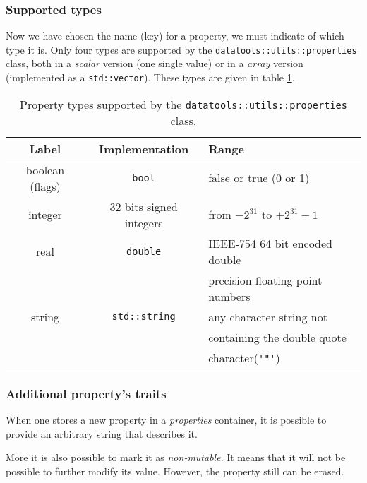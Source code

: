 \subsubsection{Supported types}

Now we have chosen the name  (key) for a property, we must indicate of
which   type  it   is.  Only   four   types  are   supported  by   the
\texttt{datatools::utils::properties}  class, both in  a \emph{scalar}
version (one  single value) or in a  \emph{array} version (implemented
as  a  \texttt{std::vector}).  These  types  are given  in  table
\ref{tab::properties:types:0}.

\begin{table}[h]
\begin{center}
\begin{tabular}{|c|c|l|}
\hline
Label      &   Implementation & Range \\
\hline
\hline
boolean (flags) & \texttt{bool} & false or true (0 or 1)  \\
\hline
integer    & 32 bits signed integers & from $-2^{31}$ to $+2^{31}-1$ \\
\hline
real       & \texttt{double}  & IEEE-754 64 bit encoded double \\
           &                  & precision floating point numbers \\
\hline
string     &  \texttt{std::string} & any character string not \\
           &                       & containing the double quote \\
           &                       & character(\verb+'"'+) \\
\hline
\end{tabular}
\end{center}
\caption{Property         types        supported         by        the
  \texttt{datatools::utils::properties} class.}
\label{tab::properties:types:0}
\end{table}



\subsubsection{Additional property's traits}

When one stores a new property in a \emph{properties} container, it is
possible to provide an arbitrary string that describes it.

More it  is also possible to  mark it as  \emph{non-mutable}. It means
that it will not be possible to further modify its value. However, the
property still can be erased.

